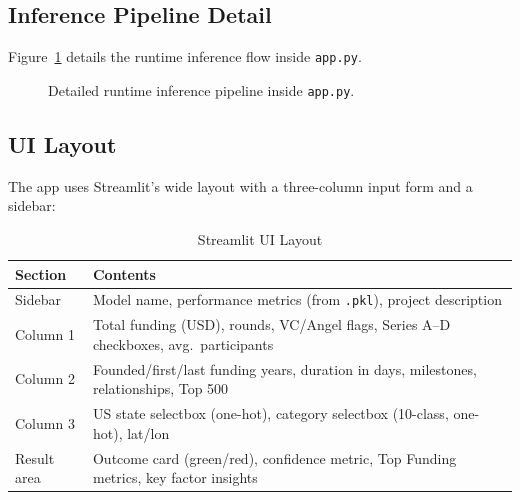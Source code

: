 \documentclass[12pt,a4paper]{article}
\begin{document}
\subsection{Inference Pipeline Detail}

Figure~\ref{fig:infer} details the runtime inference flow inside \texttt{app.py}.

\begin{figure}[H]
\centering
{}
\caption{Detailed runtime inference pipeline inside \texttt{app.py}.}
\label{fig:infer}
\end{figure}

\subsection{UI Layout}

The app uses Streamlit's wide layout with a three-column input form and a sidebar:

\begin{table}[H]
\centering
\caption{Streamlit UI Layout}
\begin{tabular}{lp{9cm}}
\toprule
\textbf{Section} & \textbf{Contents} \\
\midrule
Sidebar      & Model name, performance metrics (from \texttt{.pkl}), project description \\
Column 1     & Total funding (USD), rounds, VC/Angel flags, Series A--D checkboxes, avg.\ participants \\
Column 2     & Founded/first/last funding years, duration in days, milestones, relationships, Top 500 \\
Column 3     & US state selectbox (one-hot), category selectbox (10-class, one-hot), lat/lon \\
Result area  & Outcome card (green/red), confidence metric, Top Funding metrics, key factor insights \\
\bottomrule
\end{tabular}
\end{table}
\end{document}
